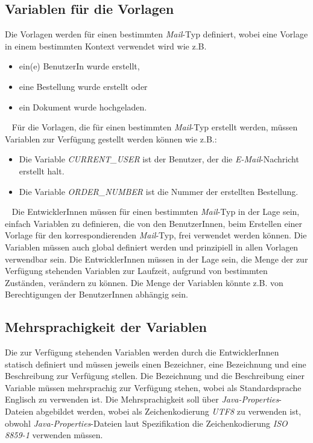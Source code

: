 \subsection{Variablen für die Vorlagen}
Die Vorlagen werden für einen bestimmten \emph{Mail}-Typ definiert, wobei eine Vorlage in einem bestimmten Kontext verwendet wird wie z.B.
\begin{itemize}
	\item ein(e) BenutzerIn wurde erstellt,
	\item eine Bestellung wurde erstellt oder
	\item ein Dokument wurde hochgeladen.
\end{itemize}
\ \newline
Für die Vorlagen, die für einen bestimmten \emph{Mail}-Typ erstellt werden, müssen Variablen zur Verfügung gestellt werden können wie z.B.:
\begin{itemize}
	\item Die Variable \emph{CURRENT\_USER} ist der Benutzer, der die \emph{E-Mail}-Nachricht erstellt halt.
	\item Die Variable \emph{ORDER\_NUMBER} ist die Nummer der erstellten Bestellung.
\end{itemize}
\ \newline
Die EntwicklerInnen müssen für einen bestimmten \emph{Mail}-Typ in der Lage sein, einfach Variablen zu definieren, die von den BenutzerInnen, beim Erstellen einer Vorlage für den korrespondierenden \emph{Mail}-Typ, frei verwendet werden können. Die Variablen müssen auch global definiert werden und prinzipiell in allen Vorlagen verwendbar sein. Die EntwicklerInnen müssen in der Lage sein, die Menge der zur Verfügung stehenden Variablen zur Laufzeit, aufgrund von bestimmten Zuständen, verändern zu können. Die Menge der Variablen könnte z.B. von Berechtigungen der BenutzerInnen abhängig sein.

\subsection{Mehrsprachigkeit der Variablen}
Die zur Verfügung stehenden Variablen werden durch die EntwicklerInnen statisch definiert und müssen jeweils einen Bezeichner, eine Bezeichnung und eine Beschreibung zur Verfügung stellen. Die Bezeichnung und die Beschreibung einer Variable müssen mehrsprachig zur Verfügung stehen, wobei als Standardsprache Englisch zu verwenden ist. Die Mehrsprachigkeit soll über \emph{Java-Properties}-Dateien abgebildet werden, wobei als Zeichenkodierung \emph{UTF8} zu verwenden ist, obwohl \emph{Java-Properties}-Dateien laut Spezifikation die Zeichenkodierung \emph{ISO 8859-1} verwenden müssen.

